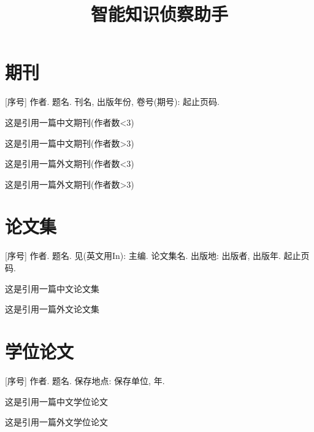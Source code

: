 \documentclass[UTF8, a4paper, 12pt, AutoFakeBold, twoside]{ctexart} %
\title{智能知识侦察助手}
\begin{document}
\section{期刊}

 [序号] 作者. 题名\nobreak[J]. 刊名, 出版年份, 卷号(期号): 起止页码.

这是引用一篇中文期刊\cite{李静2021多语言}(作者数<3)

这是引用一篇中文期刊\cite{张德海2018基于}(作者数>3)

这是引用一篇外文期刊\cite{Deng2013ApplicationOE}(作者数<3)

这是引用一篇外文期刊\cite{you2022knowledge}(作者数>3)

\section{论文集}

 [序号] 作者. 题名\nobreak[A]. 见(英文用In): 主编. 论文集名\nobreak[C]. 出版地: 出版者, 出版年. 起止页码.

这是引用一篇中文论文集\cite{封晨}

这是引用一篇外文论文集\cite{dong2014knowledge}

\section{学位论文}

 [序号] 作者. 题名\nobreak[D]. 保存地点: 保存单位, 年.

这是引用一篇中文学位论文\cite{姚歆蕾2021基于}

这是引用一篇外文学位论文\cite{w2021e}

\end{document}

